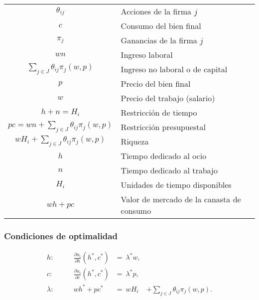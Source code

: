 \documentclass[8pt,a4paper]{extarticle}
\begin{document}
\begin{multicols}{3}
\begin{center}
\begin{tabular}{ c l }
	\hline
	$\theta_{ij}$								                      & Acciones de la firma $j$ \\
	$c$											                      & Consumo del bien final \\
	$\pi_j$										                      & Ganancias de la firma $j$ \\
	$wn$										                      & Ingreso laboral \\
	$\displaystyle \sum_{j \in J} \theta_{ij} \pi_j (w, p)$			  & Ingreso no laboral o de capital \\
	$p$											                      & Precio del bien final \\
	$w$											                      & Precio del trabajo (salario) \\
	$h + n = H_i$								                      & Restricción de tiempo \\
	$\displaystyle pc = wn + \sum_{j \in J} \theta_{ij} \pi_j (w, p)$ & Restricción presupuestal \\
	$\displaystyle wH_i + \sum_{j \in J} \theta_{ij} \pi_j (w, p)$    & Riqueza \\
	$h$											                      & Tiempo dedicado al ocio \\
	$n$											                      & Tiempo dedicado al trabajo \\
	$H_i$										                      & Unidades de tiempo disponibles \\
	$wh + pc$									                      & Valor de mercado de la canasta de consumo \\
	\hline
\end{tabular}
\end{center}

\sectionbreak

\subsubsection*{Condiciones de optimalidad}

\begin{equation*}
\begin{aligned}
	h : \qquad & \frac{\partial u_i}{\partial h} (h^*, c^*) &=\ \lambda^* w,\\
	c : \qquad & \frac{\partial u_i}{\partial c} (h^*, c^*) &=\ \lambda^* p,\\
	\lambda : \qquad & wh^* + pc^* &=\ wH_i & + \sum_{j \in J} \theta_{ij} \pi_j (w, p).
\end{aligned}
\end{equation*}


\end{multicols}
\end{document}
